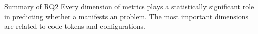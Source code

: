 \begin{comment}
\label{tab:individual_importance}
\end{table}


\end{comment}


\vspace{0.5cm}
\begin{Summary}{Summary of RQ2}{}
Every dimension of metrics plays a statistically significant role in predicting whether a \instance manifests an \inconsistent problem. The most important dimensions are related to code tokens and configurations. 
\end{Summary}


